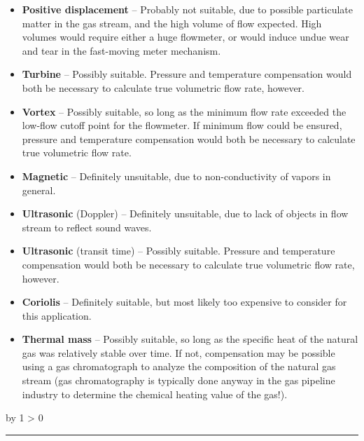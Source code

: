 \documentclass[12pt,a4paper]{article}
\def\svar{
           \advance\answnum by 1
           \ifnum \answnum > 0
                \hrule
                \vskip 3pt
                \leftline{Svar \the\answnum}
                \vskip 3pt \fi}
\begin{document}
\vskip 10pt

\begin{itemize}
\item{} {\bf Positive displacement} -- Probably not suitable, due to possible particulate matter in the gas stream, and the high volume of flow expected.  High volumes would require either a huge flowmeter, or would induce undue wear and tear in the fast-moving meter mechanism.
\vskip 10pt
\item{} {\bf Turbine} -- Possibly suitable.  Pressure and temperature compensation would both be necessary to calculate true volumetric flow rate, however.
\vskip 10pt
\item{} {\bf Vortex} -- Possibly suitable, so long as the minimum flow rate exceeded the low-flow cutoff point for the flowmeter.  If minimum flow could be ensured, pressure and temperature compensation would both be necessary to calculate true volumetric flow rate.
\vskip 10pt
\item{} {\bf Magnetic} -- Definitely unsuitable, due to non-conductivity of vapors in general.
\vskip 10pt
\item{} {\bf Ultrasonic} (Doppler) -- Definitely unsuitable, due to lack of objects in flow stream to reflect sound waves. 
\vskip 10pt
\item{} {\bf Ultrasonic} (transit time) -- Possibly suitable.  Pressure and temperature compensation would both be necessary to calculate true volumetric flow rate, however.
\vskip 10pt
\item{} {\bf Coriolis} -- Definitely suitable, but most likely too expensive to consider for this application.
\vskip 10pt
\item{} {\bf Thermal mass} -- Possibly suitable, so long as the specific heat of the natural gas was relatively stable over time.  If not, compensation may be possible using a gas chromatograph to analyze the composition of the natural gas stream (gas chromatography is typically done anyway in the gas pipeline industry to determine the chemical heating value of the gas!).
\end{itemize}

 
\vskip 10pt \filbreak 
\svar{} 
\end{document}

